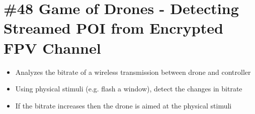 \section{\#48 Game of Drones - Detecting Streamed POI from Encrypted FPV Channel}
\begin{itemize}
	\item Analyzes the bitrate of a wireless transmission between drone and controller
	\item Using physical stimuli (e.g. flash a window), detect the changes in bitrate
	\item If the bitrate increases then the drone is aimed at the physical stimuli
\end{itemize}